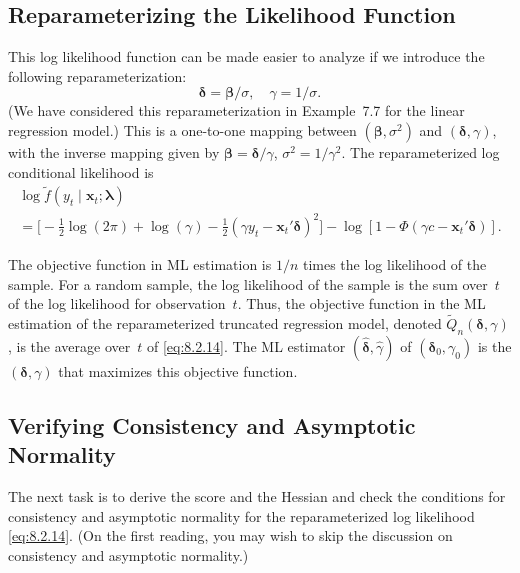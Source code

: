 \subsection*{Reparameterizing the Likelihood Function}

This log likelihood function can be made easier to analyze if we introduce the
following reparameterization:
\begin{equation}
  \boldsymbol{\delta} = \boldsymbol{\beta}/\sigma, \quad \gamma = 1/\sigma.
  \label{eq:8.2.13} \tag{8.2.13}
\end{equation}
(We have considered this reparameterization in Example~7.7 for the linear regression model.) This is a one-to-one mapping between $(\boldsymbol{\beta}, \sigma^2)$ and
$(\boldsymbol{\delta}, \gamma)$, with the inverse mapping given by
$\boldsymbol{\beta} = \boldsymbol{\delta}/\gamma$, $\sigma^2 = 1/\gamma^2$.
The reparameterized log conditional likelihood is
\begin{multline}
  \log \tilde{f}(y_t \mid \mathbf{x}_t; \boldsymbol{\lambda}) \\
  = \bigl[-\tfrac{1}{2}\log(2\pi) + \log(\gamma)
    - \tfrac{1}{2}(\gamma y_t - \mathbf{x}_t'\boldsymbol{\delta})^2\bigr]
    - \log[1 - \Phi(\gamma c - \mathbf{x}_t'\boldsymbol{\delta})].
  \label{eq:8.2.14} \tag{8.2.14}
\end{multline}

The objective function in ML estimation is $1/n$ times the log likelihood of the
sample. For a random sample, the log likelihood of the sample is the sum over~$t$
of the log likelihood for observation~$t$. Thus, the objective function in the ML
estimation of the reparameterized truncated regression model, denoted
$\tilde{Q}_n(\boldsymbol{\delta}, \gamma)$, is the average over~$t$ of \eqref{eq:8.2.14}. The ML estimator
$(\hat{\boldsymbol{\delta}}, \hat{\gamma})$ of $(\boldsymbol{\delta}_0, \gamma_0)$ is the $(\boldsymbol{\delta}, \gamma)$
that maximizes this objective function.

\subsection*{Verifying Consistency and Asymptotic Normality}

The next task is to derive the score and the Hessian and check the conditions
for consistency and asymptotic normality for the reparameterized log likelihood
\eqref{eq:8.2.14}. (On the first reading, you may wish to skip the discussion on consistency
and asymptotic normality.)

